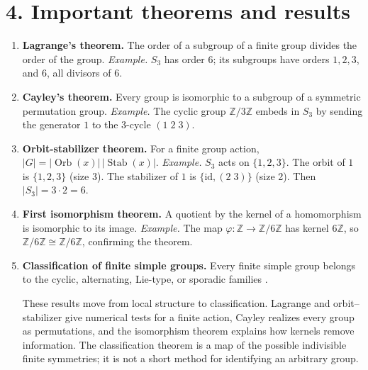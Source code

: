 \section*{4. Important theorems and results}
\begin{enumerate}[leftmargin=*,itemsep=0.35em]
\item \textbf{Lagrange's theorem.} The order of a subgroup of a finite group divides the order of the group. \emph{Example.} $S_3$ has order $6$; its subgroups have orders $1,2,3$, and $6$, all divisors of $6$.

\item \textbf{Cayley's theorem.} Every group is isomorphic to a subgroup of a symmetric permutation group. \emph{Example.} The cyclic group $\mathbb{Z}/3\mathbb{Z}$ embeds in $S_3$ by sending the generator $1$ to the 3-cycle $(1\;2\;3)$.

\item \textbf{Orbit-stabilizer theorem.} For a finite group action, $|G|=|\operatorname{Orb}(x)|\,|\operatorname{Stab}(x)|$. \emph{Example.} $S_3$ acts on $\{1,2,3\}$. The orbit of $1$ is $\{1,2,3\}$ (size 3). The stabilizer of $1$ is $\{\text{id},(2\;3)\}$ (size 2). Then $|S_3|=3\cdot 2=6$.

\item \textbf{First isomorphism theorem.} A quotient by the kernel of a homomorphism is isomorphic to its image. \emph{Example.} The map $\varphi:\mathbb{Z}\to\mathbb{Z}/6\mathbb{Z}$ has kernel $6\mathbb{Z}$, so $\mathbb{Z}/6\mathbb{Z}\cong\mathbb{Z}/6\mathbb{Z}$, confirming the theorem.

\item \textbf{Classification of finite simple groups.} Every finite simple group belongs to the cyclic, alternating, Lie-type, or sporadic families \cite{group_theory_ref2}.

These results move from local structure to classification. Lagrange and orbit--stabilizer give numerical tests for a finite action, Cayley realizes every group as permutations, and the isomorphism theorem explains how kernels remove information. The classification theorem is a map of the possible indivisible finite symmetries; it is not a short method for identifying an arbitrary group.
\end{enumerate}

\theoryapplications
{}
